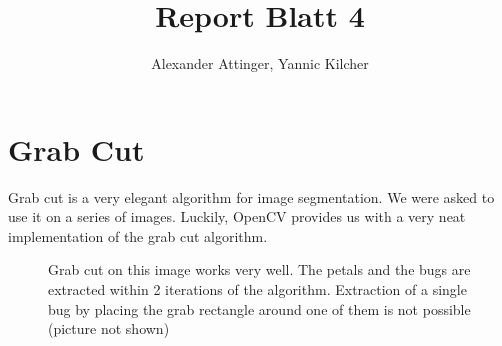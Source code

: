 \documentclass[11pt,a4paper]{article}
\author{Alexander Attinger, Yannic Kilcher}
\title{Report Blatt 4}
\begin{document}
\maketitle

\section{Grab Cut}
Grab cut is a very elegant algorithm for image segmentation. We were asked to use it on a series of images. Luckily, OpenCV provides us with a very neat implementation of the grab cut algorithm.
\begin{figure}
\centering
{}
\quad
{}

\caption{Grab cut on this image works very well. The petals and the bugs are extracted within 2 iterations of the algorithm. Extraction of a single bug by placing the grab rectangle around one of them is not possible (picture not shown)}%

\end{figure}
\end{document}

